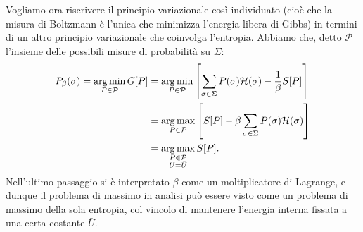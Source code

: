 Vogliamo ora riscrivere il principio variazionale così individuato (cioè che la misura di Boltzmann è l'unica che minimizza l'energia libera di Gibbs) in termini di un altro principio variazionale che coinvolga l'entropia. Abbiamo che, detto $ \mathcal{P} $ l'insieme delle possibili misure di probabilità su $ \Sigma $:
\begin{align*}
    P_\beta(\sigma) = \operatorname*{arg\, min}_{P\in\mathcal{P}} G[P] & = \operatorname*{arg\, min}_{P\in\mathcal{P}} \left[ \sum_{\sigma\in\Sigma} P(\sigma) \mathcal{H}(\sigma) - \frac{1}{\beta} S[P] \right]\\
                                                     & = \operatorname*{arg\, max}_{P\in\mathcal{P}} \left[ S[P] - \beta \sum_{\sigma\in\Sigma}P(\sigma)\mathcal{H}(\sigma) \right]\\
                                                     & = \operatorname*{arg\, max}_{\substack{P\in\mathcal{P}\\ U=\bar{U}}} S[P].
\end{align*}
Nell'ultimo passaggio si è interpretato $ \beta $ come un moltiplicatore di Lagrange, e dunque il problema di massimo in analisi può essere visto come un problema di massimo della sola entropia, col vincolo di mantenere l'energia interna fissata a una certa costante $ \bar{U} $.

